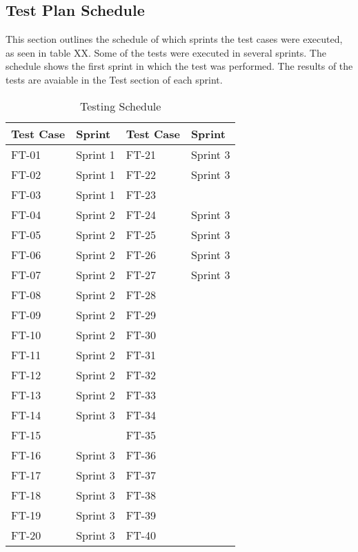 \subsection{Test Plan Schedule}

This section outlines the schedule of which sprints the test cases were executed, as seen in table XX. Some of the tests were executed in several sprints. The schedule shows the first sprint in which the test was performed. The results of the tests are avaiable in the Test section of each sprint.


\begin{table}[h]
\centering
\begin{tabular}{| l | l || l | l |}
	\rowcolor{lightgray}
	\hline
	{\bf Test Case} & {\bf Sprint} & {\bf Test Case} & {\bf Sprint} \\ \hline
	FT-01 & Sprint 1 & FT-21 & Sprint 3 \\ \hline
	FT-02 & Sprint 1 & FT-22 & Sprint 3 \\ \hline
	FT-03 & Sprint 1 & FT-23 & \\ \hline
	FT-04 & Sprint 2 & FT-24 & Sprint 3 \\ \hline
	FT-05 & Sprint 2 & FT-25 & Sprint 3 \\ \hline
	FT-06 & Sprint 2 & FT-26 & Sprint 3 \\ \hline
	FT-07 & Sprint 2 & FT-27 & Sprint 3 \\ \hline
	FT-08 & Sprint 2 & FT-28 & \\ \hline
	FT-09 & Sprint 2 & FT-29 & \\ \hline
	FT-10 & Sprint 2 & FT-30 & \\ \hline
	FT-11 & Sprint 2 & FT-31 & \\ \hline
	FT-12 & Sprint 2 & FT-32 & \\ \hline 
	FT-13 & Sprint 2 & FT-33 & \\ \hline
	FT-14 & Sprint 3 & FT-34 & \\ \hline
	FT-15 & 		 & FT-35 & \\ \hline
	FT-16 & Sprint 3 & FT-36 & \\ \hline
	FT-17 & Sprint 3 & FT-37 & \\ \hline
	FT-18 & Sprint 3 & FT-38 & \\ \hline
	FT-19 & Sprint 3 & FT-39 & \\ \hline
	FT-20 & Sprint 3 & FT-40 & \\ \hline
\end{tabular}
\caption{Testing Schedule}
\end{table}